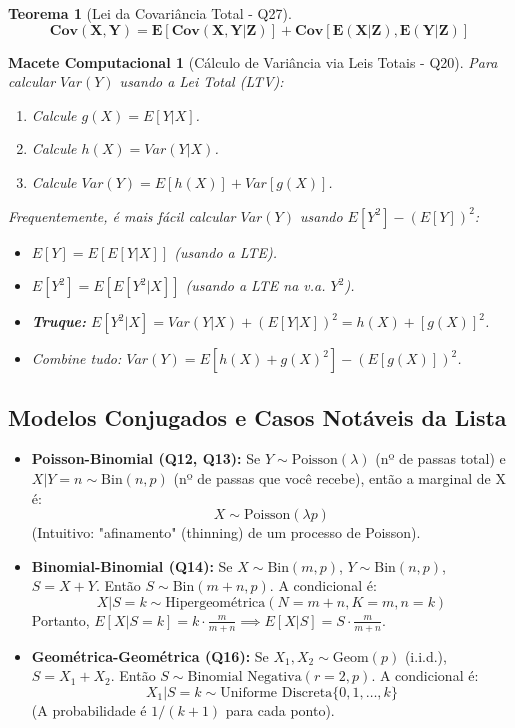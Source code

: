 \documentclass[12pt, a4paper]{article}
\newtheorem{teo}{Teorema}
\newtheorem{macete}{Macete Computacional}
\begin{document}
\begin{teo}[Lei da Covariância Total - Q27]
$$ \mathbf{Cov(X,Y) = E[Cov(X,Y|Z)] + Cov[E(X|Z), E(Y|Z)]} $$
\end{teo}

\begin{macete}[Cálculo de Variância via Leis Totais - Q20]
Para calcular $Var(Y)$ usando a Lei Total (LTV):
\begin{enumerate}
    \item Calcule $g(X) = E[Y|X]$.
    \item Calcule $h(X) = Var(Y|X)$.
    \item Calcule $Var(Y) = E[h(X)] + Var[g(X)]$.
\end{enumerate}
Frequentemente, é mais fácil calcular $Var(Y)$ usando $E[Y^2] - (E[Y])^2$:
\begin{itemize}
    \item $E[Y] = E[E[Y|X]]$ (usando a LTE).
    \item $E[Y^2] = E[E[Y^2|X]]$ (usando a LTE na v.a. $Y^2$).
    \item \textbf{Truque:} $E[Y^2|X] = Var(Y|X) + (E[Y|X])^2 = h(X) + [g(X)]^2$.
    \item Combine tudo: $Var(Y) = E[h(X) + g(X)^2] - (E[g(X)])^2$.
\end{itemize}
\end{macete}

\subsection{Modelos Conjugados e Casos Notáveis da Lista}

\begin{itemize}
    \item \textbf{Poisson-Binomial (Q12, Q13):} Se $Y \sim \text{Poisson}(\lambda)$ (nº de passas total) e $X|Y=n \sim \text{Bin}(n, p)$ (nº de passas que você recebe), então a marginal de X é:
    $$ X \sim \text{Poisson}(\lambda p) $$
    (Intuitivo: "afinamento" (thinning) de um processo de Poisson).

    \item \textbf{Binomial-Binomial (Q14):} Se $X \sim \text{Bin}(m,p)$, $Y \sim \text{Bin}(n,p)$, $S = X+Y$.
    Então $S \sim \text{Bin}(m+n, p)$. A condicional é:
    $$ X | S=k \sim \text{Hipergeométrica}(N=m+n, K=m, n=k) $$
    Portanto, $E[X|S=k] = k \cdot \frac{m}{m+n} \implies E[X|S] = S \cdot \frac{m}{m+n}$.

    \item \textbf{Geométrica-Geométrica (Q16):} Se $X_1, X_2 \sim \text{Geom}(p)$ (i.i.d.), $S = X_1+X_2$.
    Então $S \sim \text{Binomial Negativa}(r=2, p)$. A condicional é:
    $$ X_1 | S=k \sim \text{Uniforme Discreta}\{0, 1, \dots, k\} $$
    (A probabilidade é $1/(k+1)$ para cada ponto).
\end{itemize}
\end{document}
